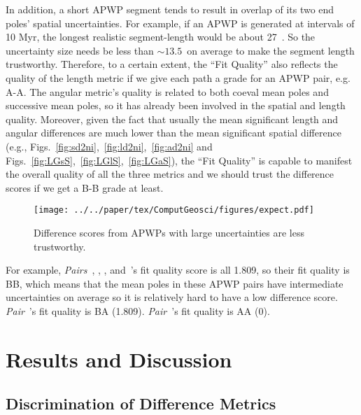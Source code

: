 In addition, a short APWP segment tends to result in overlap of its two end
poles' spatial uncertainties. For example, if an APWP is generated at intervals
of 10 Myr, the longest realistic segment-length would be about
27\degree~\cite[the maximum rate of plate movement is about 30 cm/yr]{S09,K14}.
So the uncertainty size needs be less than ${\sim}13.5$\degree\ on average to
make the segment length trustworthy. Therefore, to a certain extent, the ``Fit
Quality'' also reflects the quality of the length metric if we give each path a
grade for an APWP pair, e.g. A-A. The angular metric’s quality is related to
both coeval mean poles and successive mean poles, so it has already been
involved in the spatial and length quality. Moreover, given the fact that
usually the mean significant length and angular differences are much lower than
the mean significant spatial difference (e.g.,
Figs.~\ref{fig:sd2ni},~\ref{fig:ld2ni},~\ref{fig:ad2ni} and
Figs.~\ref{fig:LGsS},~\ref{fig:LGlS},~\ref{fig:LGaS}), the ``Fit Quality'' is
capable to manifest the overall quality of all the three metrics and we should
trust the difference scores if we get a B-B grade at least.

\begin{figure}[tbp]
\texttt{[image: ../../paper/tex/ComputGeosci/figures/expect.pdf]}
\caption[]{Difference scores from APWPs with large uncertainties are less
trustworthy.}\label{fig:FitQ}
\end{figure}

For example, \emph{Pairs}~\textbf{},
\textbf{}, \textbf{},
\textbf{} and~\textbf{}'s fit quality
score is all 1.809, so their fit quality is B\textendash{}B,
which means that the mean poles in these APWP pairs have intermediate
uncertainties on average so it is relatively hard to have a low difference
score. \emph{Pair}~\textbf{}'s fit quality is B\textendash{}A
(1.809). \emph{Pair}~\textbf{}'s fit quality
is A\textendash{}A (0).

\section{Results and Discussion}

\subsection{Discrimination of Difference Metrics}

